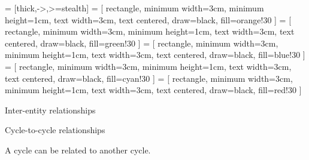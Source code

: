  = [thick,->,>=stealth]
     = [
        rectangle,
        minimum width=3cm,
        minimum height=1cm,
        text width=3cm,
        text centered,
        draw=black,
        fill=orange!30
    ]
     = [
        rectangle,
        minimum width=3cm,
        minimum height=1cm,
        text width=3cm,
        text centered,
        draw=black,
        fill=green!30
    ]
     = [
        rectangle,
        minimum width=3cm,
        minimum height=1cm,
        text width=3cm,
        text centered,
        draw=black,
        fill=blue!30
    ]
     = [
        rectangle,
        minimum width=3cm,
        minimum height=1cm,
        text width=3cm,
        text centered,
        draw=black,
        fill=cyan!30
    ]
     = [
        rectangle,
        minimum width=3cm,
        minimum height=1cm,
        text width=3cm,
        text centered,
        draw=black,
        fill=red!30
    ]

\begin{frame}{Inter-entity relationships}

    \centering
    

\end{frame}

\begin{frame}{Cycle-to-cycle relationships}

    A cycle can be related to another cycle.

    \begin{center}
    \end{center}

    
\end{frame}


